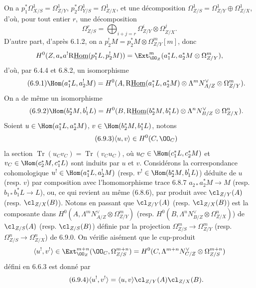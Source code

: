 On a $p_1^*\Omega^1_{X/S}=\Omega^1_{Z/Y}$, $p_2^*\Omega^1_{Y/S}=\Omega^1_{Z/X}$, et une décomposition $\Omega^1_{Z/S}=\Omega^1_{Z/Y}\oplus\Omega^1_{Z/X}$, d'où, pour tout entier $r$, une décomposition
\begin{equation}
\tag{6.9.0}
\Omega^r_{Z/S}=\bigoplus_{i+j=r}\Omega^i_{Z/Y}\otimes\Omega^j_{Z/X}.
\end{equation}
D'autre part, d'après 6.1.2, on a $p_2^!M=p_2^*M\otimes\Omega^m_{Z/Y}[m]$, donc
\[
H^0(Z,a_*a^!\mathrm{R}\underline{\mathrm{Hom}}(p_1^*L,p_2^!M))=\Ext^m_{\OO_Z}(a_1^*L,a_2^*M\otimes\Omega^m_{Z/Y}),
\]
d'où, par 6.4.4 et 6.8.2, un isomorphisme
\begin{equation}
\tag{6.9.1}
\Hom(a_1^*L,a_2^!M)=H^0(A,\mathrm{R}\underline{\mathrm{Hom}}(a_1^*L,a_2^*M)\otimes\Lambda^m N_{A/Z}^{\vee}\otimes\Omega^m_{Z/Y}).
\end{equation}
On a de même un isomorphisme
\begin{equation}
\tag{6.9.2}
\Hom(b_2^*M,b_1^!L)=H^0(B,\mathrm{R}\underline{\mathrm{Hom}}(b_2^*M,b_1^*L)\otimes\Lambda^n N_{B/Z}^{\vee}\otimes\Omega^n_{Z/X}).
\end{equation}
Soient $u\in\Hom(a_1^*L,a_2^*M)$, $v\in\Hom(b_2^*M,b_1^*L)$, notons
\begin{equation}
\tag{6.9.3}
\langle u,v\rangle\in H^0(C,\OO_C)
\end{equation}
la
section $\operatorname{Tr}(u_Cv_C)=\operatorname{Tr}(v_Cu_C)$, où $u_C\in\Hom(c_1^*L,c_2^*M)$ et $v_C\in\Hom(c_2^*M,c_1^*L)$ sont induits par $u$ et $v$. Considérons la correspondance cohomologique $u^!\in\Hom(a_1^*L,a_2^!M)$ (resp. $v^!\in\Hom(b_2^*M,b_1^!L)$) déduite de $u$ (resp. $v$) par composition avec l'homomorphisme trace 6.8.7 $a_{2*}a_2^*M\to M$ (resp. $b_{1*}b_1^*L\to L$), ou, ce qui revient au même (6.8.6), par produit avec $\cl_{Z/Y}(A)$ (resp. $\cl_{Z/X}(B)$). Notons en passant que $\cl_{Z/Y}(A)$ (resp. $\cl_{Z/X}(B)$) est la composante dans $H^0(A,\Lambda^mN_{A/Z}^{\vee}\otimes\Omega^m_{Z/Y})$ (resp. $H^0(B,\Lambda^nN_{B/Z}^{\vee}\otimes\Omega^n_{Z/X})$) de $\cl_{Z/S}(A)$ (resp. $\cl_{Z/S}(B)$) définie par la projection $\Omega^m_{Z/S}\to\Omega^m_{Z/Y}$ (resp. $\Omega^n_{Z/S}\to\Omega^n_{Z/X}$) de 6.9.0. On vérifie aisément que le cup-produit
\[
\langle u^!,v^!\rangle\in\Ext^{m+n}_{\OO_Z}(\OO_C,\Omega^{m+n}_{Z/S})=H^0(C,\Lambda^{m+n}N_{C/Z}^{\vee}\otimes\Omega^{m+n}_{Z/S})
\]
défini en 6.6.3 est donné par
\begin{equation}
\tag{6.9.4}
\langle u^!,v^!\rangle=\langle u,v\rangle\cl_{Z/Y}(A)\cl_{Z/X}(B).
\end{equation}
